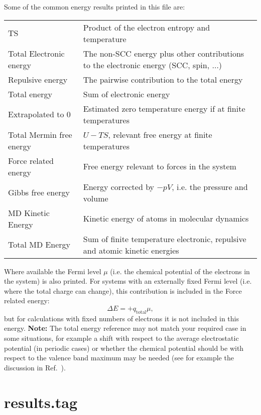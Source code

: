 Some of the common energy results printed in this file are:\\

\begin{center}
  \begin{tabular}{|l|p{5.5cm}|}
    \hline
    TS& Product of the electron entropy and temperature\\
    Total Electronic energy& The non-SCC energy plus other contributions to the
    electronic energy (SCC, spin, $\ldots$)\\
    Repulsive energy& The pairwise contribution to the total energy\\
    Total energy& Sum of electronic energy\\
    Extrapolated to 0& Estimated zero temperature energy if at finite
    temperatures\\
    Total Mermin free energy& $U - T S$, relevant free energy at finite
    temperatures\\
    Force related energy& Free energy relevant to forces in the system\\
    Gibbs free energy& Energy corrected by $- p V$, i.e. the pressure and volume\\
    MD Kinetic Energy& Kinetic energy of atoms in molecular dynamics\\
    Total MD Energy& Sum of finite temperature electronic, repulsive and atomic
    kinetic energies\\
    \hline
  \end{tabular}
\end{center}

Where available the Fermi level $\mu$ (i.e. the chemical potential of the
electrons in the system) is also printed. For systems with an externally fixed
Fermi level (i.e. where the total charge can change), this contribution is
included in the Force related energy:
\begin{equation*}
  \Delta E = + q_\mathrm{total} \mu,
\end{equation*}
but for calculations with fixed numbers of electrons it is not included in this
energy. \textbf{Note:} The total energy reference may not match your required
case in some situations, for example a shift with respect to the average
electrostatic potential (in periodic cases) or whether the chemical potential
should be with respect to the valence band maximum may be needed (see for
example the discussion in Ref.~\cite{Lany_2009}).

\section{results.tag}
\label{sec:dftbp.results}

